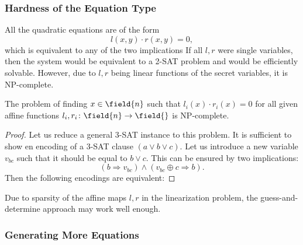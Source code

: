 \subsubsection{Hardness of the Equation Type}

All the quadratic equations are of the form
$$
l(x,y) \cdot r(x,y) = 0,
$$
which is equivalent to any of the two implications
If all $l,r$ were single variables, then the system would be equivalent to a 2-SAT problem and would be efficiently solvable. However, due to $l,r$ being linear functions of the secret variables, it is NP-complete.
\begin{proposition}
The problem of finding $x \in \field{n}$ such that $l_i(x) \cdot r_i(x) = 0$ for all given affine functions $l_i,r_i\colon \field{n} \to \field{}$ is NP-complete.
\end{proposition}
\begin{proof}
Let us reduce a general 3-SAT instance to this problem. It is sufficient to show en encoding of a 3-SAT clause $(a \lor b \lor c)$. Let us introduce a new variable $v_{bc}$ such that it should be equal to $b \lor c$. This can be ensured by two implications:
$$(b \Rightarrow v_{bc}) \land (v_{bc} \oplus c \Rightarrow b).$$
Then the following encodings are equivalent:
\end{proof}
Due to sparsity of the affine maps $l,r$ in the linearization problem, the guess-and-determine approach may work well enough.

\subsubsection{Generating More Equations}

